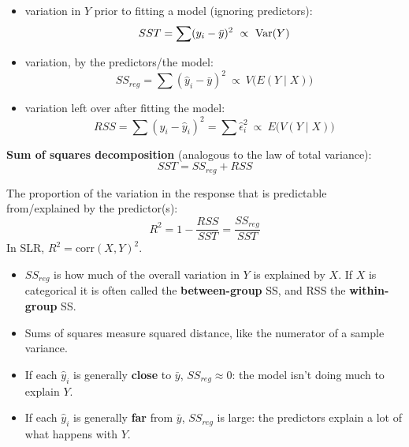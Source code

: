 \begin{definition}
    \begin{itemize}
        \item {} variation in $Y$ prior to fitting a model (ignoring predictors):
        \[SST=\sum(y_i-\bar y)^2\ \propto\ \Var(Y)\]
        \item {} variation, by the predictors/the model:
        \[SS_{reg}=\sum(\hat y_i-\bar y)^2\ \propto\ V\big(E(Y\mid X)\big)\]
        \item {} variation left over after fitting the model:
        \[RSS=\sum(y_i-\hat y_i)^2=\sum\hat\epsilon_i^2\ \propto\ E\big(V(Y\mid X)\big)\]
    \end{itemize}
    \textbf{Sum of squares decomposition} (analogous to the law of total variance):
    \[\boxed{SST=SS_{reg}+RSS}\]
\end{definition}

\begin{definition}
    The proportion of the variation in the response that is predictable from/explained by
    the predictor(s):
    \[\boxed{R^2=1-\frac{RSS}{SST}=\frac{SS_{reg}}{SST}}\]
    In SLR, $R^2=\mathrm{corr}(X,Y)^2$.
\end{definition}

\begin{remark}
    \begin{itemize}
        \item $SS_{reg}$ is how much of the overall variation in $Y$ is explained by $X$. If $X$
        is categorical it is often called the \textbf{between-group} SS, and RSS the
        \textbf{within-group} SS.
        \item Sums of squares measure squared distance, like the numerator of a sample variance.
        \item If each $\hat y_i$ is generally \textbf{close} to $\bar y$, $SS_{reg}\approx0$: the
        model isn't doing much to explain $Y$.
        \item If each $\hat y_i$ is generally \textbf{far} from $\bar y$, $SS_{reg}$ is large: the
        predictors explain a lot of what happens with $Y$.
    \end{itemize}
\end{remark}

